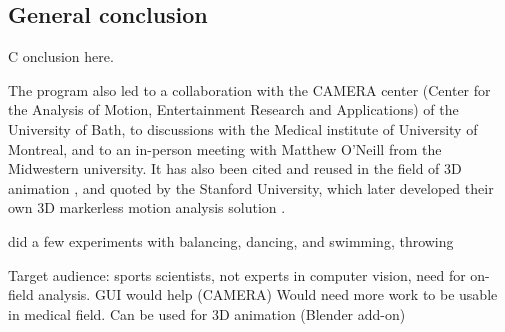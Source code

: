 

{} \mtcaddchapter
{}

\vspace*{-1cm}
\begin{flushright}
\section*{\fontsize{20pt}{20pt}\selectfont\textnormal{General conclusion}}
\end{flushright}
\vspace{2cm}

\chead[\fancyplain{}{}]
      {\fancyplain{}{}}
\lfoot[\fancyplain{}{}]
      {\fancyplain{}{}}
\cfoot[\fancyplain{}{\thepage}]
      {\fancyplain{}{\thepage}}
\rfoot[\fancyplain{}{}]
     {\fancyplain{}{\scriptsize}}


\lettrine[lines=1]{C}{ }onclusion here.

The program also led to a collaboration with the CAMERA center (Center for the Analysis of Motion, Entertainment Research and Applications) of the University of Bath, to discussions with the Medical institute of University of Montreal, and to an in-person meeting with Matthew O'Neill from the Midwestern university. It has also been cited and reused in the field of 3D animation \cite{Barreto2022}, and quoted by the Stanford University, which later developed their own 3D markerless motion analysis solution \cite{Uhlrich2022}.

did a few experiments with balancing, dancing, and swimming, throwing

Target audience: sports scientists, not experts in computer vision, need for on-field analysis. GUI would help (CAMERA)
Would need more work to be usable in medical field. Can be used for 3D animation (Blender add-on)


